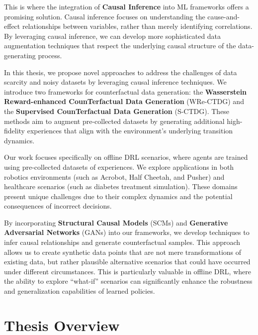 This is where the integration of \textbf{Causal Inference} into
ML frameworks offers a
promising solution. Causal inference focuses on understanding the
cause-and-effect relationships between variables, rather
than merely identifying correlations. By leveraging causal inference,
we can develop more sophisticated data augmentation techniques that
respect the underlying causal structure of the data-generating process.

In this thesis, we propose novel approaches to address the
challenges of data scarcity and noisy datasets by leveraging
causal inference techniques. We introduce two frameworks for
counterfactual data generation:
the \textbf{Wasserstein Reward-enhanced CounTerfactual Data Generation}
(WRe-CTDG) and the \textbf{Supervised CounTerfactual Data Generation} (S-CTDG).
These methods aim to augment pre-collected datasets by generating additional
high-fidelity experiences that align with the environment's underlying
transition dynamics.

Our work focuses specifically on offline DRL scenarios, where agents
are trained using pre-collected datasets of experiences.
We explore applications in both robotics environments
(such as Acrobot, Half Cheetah, and Pusher) and healthcare scenarios
(such as diabetes treatment simulation).
These domains present unique challenges due to their complex
dynamics and the potential consequences of incorrect decisions.

By incorporating \textbf{Structural Causal Models} (SCMs) and
\textbf{Generative Adversarial Networks} (GANs) into our frameworks,
we develop techniques to infer causal relationships and generate counterfactual
samples. This approach allows us to create synthetic data points
that are not mere transformations of existing data, but rather plausible
alternative scenarios that could have occurred under different circumstances.
This is particularly valuable in offline DRL, where the ability to explore
``what-if'' scenarios can significantly enhance the robustness
and generalization capabilities of learned policies.

\section{Thesis Overview}


